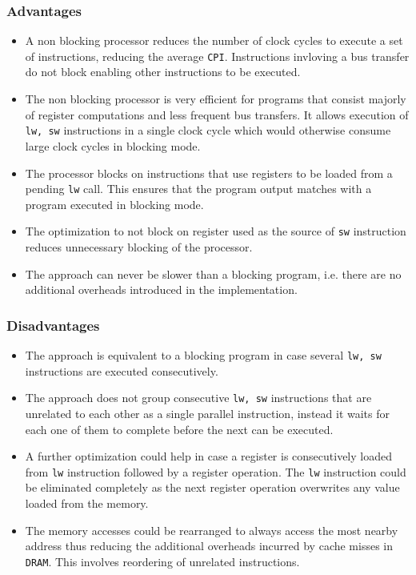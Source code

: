 \documentclass[hidelinks,12pt]{article}
\begin{document}
\subsubsection{Advantages}
\begin{itemize}
    \item A non blocking processor reduces the number of clock cycles to execute a set of instructions, reducing the average \verb|CPI|.
          Instructions invloving a bus transfer do not block enabling other instructions to be executed.
    \item The non blocking processor is very efficient for programs that consist majorly of register computations and less frequent bus transfers. It allows execution of \verb|lw, sw| instructions in a single clock cycle which would otherwise consume large clock cycles in blocking mode.
    \item The processor blocks on instructions that use registers to be loaded from a pending \verb|lw| call. This ensures that the program output matches with a program executed in blocking mode.
    \item The optimization to not block on register used as the source of \verb|sw| instruction reduces unnecessary blocking of the processor.
    \item The approach can never be slower than a blocking program, i.e. there are no additional overheads introduced in the implementation.
\end{itemize}

\subsubsection{Disadvantages}
\begin{itemize}
    \item The approach is equivalent to a blocking program in case several \verb|lw, sw| instructions are executed consecutively.
    \item The approach does not group consecutive \verb|lw, sw| instructions that are unrelated to each other as a single parallel instruction, instead it waits for each one of them to complete before the next can be executed.
    \item A further optimization could help in case a register is consecutively loaded from \verb|lw| instruction followed by a register operation. The \verb|lw| instruction could be eliminated completely as the next register operation overwrites any value loaded from the memory.
    \item The memory accesses could be rearranged to always access the most nearby address thus reducing the additional overheads incurred by cache misses in \verb|DRAM|. This involves reordering of unrelated instructions.
\end{itemize}
\end{document}
